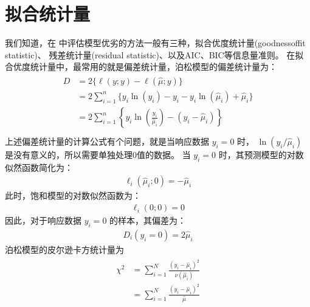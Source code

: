 \documentclass[letterpaper,10pt,english]{sphinxmanual}
\begin{document}
\section{拟合统计量}
\label{\detokenize{_u6cca_u677e_u6a21_u578b/content:id7}}
我们知道，在  中评估模型优劣的方法一般有三种，拟合优度统计量(goodness\sphinxhyphen{}of\sphinxhyphen{}fit statistic)、
残差统计量(residual statistic)、以及AIC、BIC等信息量准则。
在拟合优度统计量中，最常用的就是偏差统计量，泊松模型的偏差统计量为：
\begin{align}\label{equation:泊松模型/content:泊松模型/content:13}\!\begin{aligned}
D &=2  \{ \ell(y;y) -    \ell(\hat{\mu};y)  \}\\
&= 2\sum_{i=1}^n  \{
y_i \ln(y_i) -y_i
- y_i \ln(\hat{\mu}_i) +\hat{\mu}_i
\}\\
&= 2\sum_{i=1}^n  \left \{
y_i \ln \left (  \frac{y_i}{\hat{\mu}_i} \right )
- (y_i - \hat{\mu}_i)
\right \}\\
\end{aligned}\end{align}
上述偏差统计量的计算公式有个问题，就是当响应数据 \(y_i=0\) 时，
\(\ln  ( y_i/\hat{\mu}_i )\)
是没有意义的，所以需要单独处理0值的数据。
当 \(y_i=0\) 时，其预测模型的对数似然函数简化为：
\begin{equation}\label{equation:泊松模型/content:泊松模型/content:14}
\begin{split}\ell_i(\hat{\mu}_i;0) =  -\hat{\mu}_i\end{split}
\end{equation}
此时，饱和模型的对数似然函数为：
\begin{equation}\label{equation:泊松模型/content:泊松模型/content:15}
\begin{split}\ell_i(0;0) =  0\end{split}
\end{equation}
因此，对于响应数据 \(y_i=0\) 的样本，其偏差为：
\begin{equation}\label{equation:泊松模型/content:泊松模型/content:16}
\begin{split}D_i(y_i=0) = 2\hat{\mu}_i\end{split}
\end{equation}
泊松模型的皮尔逊卡方统计量为
\begin{align}\label{equation:泊松模型/content:泊松模型/content:17}\!\begin{aligned}
\chi^2
&= \sum_{i=1}^N \frac{ (y_i-\hat{\mu}_i)^2}{\nu(\hat{\mu}_i)}\\
&= \sum_{i=1}^N \frac{ (y_i-\hat{\mu}_i)^2}{\hat{\mu}}\\
\end{aligned}\end{align}
\end{document}
